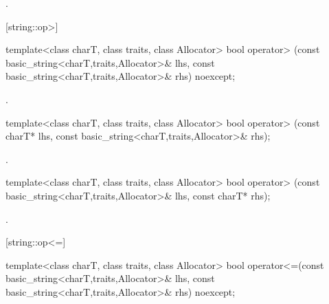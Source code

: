 \begin{itemdescr}
\pnum
\returns
{}.
\end{itemdescr}

[string::op>]{}

%
%
\begin{itemdecl}
template<class charT, class traits, class Allocator>
  bool operator> (const basic_string<charT,traits,Allocator>& lhs,
                  const basic_string<charT,traits,Allocator>& rhs) noexcept;
\end{itemdecl}

\begin{itemdescr}
\pnum
\returns
{}.
\end{itemdescr}

%
%
\begin{itemdecl}
template<class charT, class traits, class Allocator>
  bool operator> (const charT* lhs,
                  const basic_string<charT,traits,Allocator>& rhs);
\end{itemdecl}

\begin{itemdescr}
\pnum
\returns
{}.
\end{itemdescr}

%
%
\begin{itemdecl}
template<class charT, class traits, class Allocator>
  bool operator> (const basic_string<charT,traits,Allocator>& lhs,
                  const charT* rhs);
\end{itemdecl}

\begin{itemdescr}
\pnum
\returns
{}.
\end{itemdescr}

[string::op<=]{}

%
%
\begin{itemdecl}
template<class charT, class traits, class Allocator>
  bool operator<=(const basic_string<charT,traits,Allocator>& lhs,
                  const basic_string<charT,traits,Allocator>& rhs) noexcept;
\end{itemdecl}

